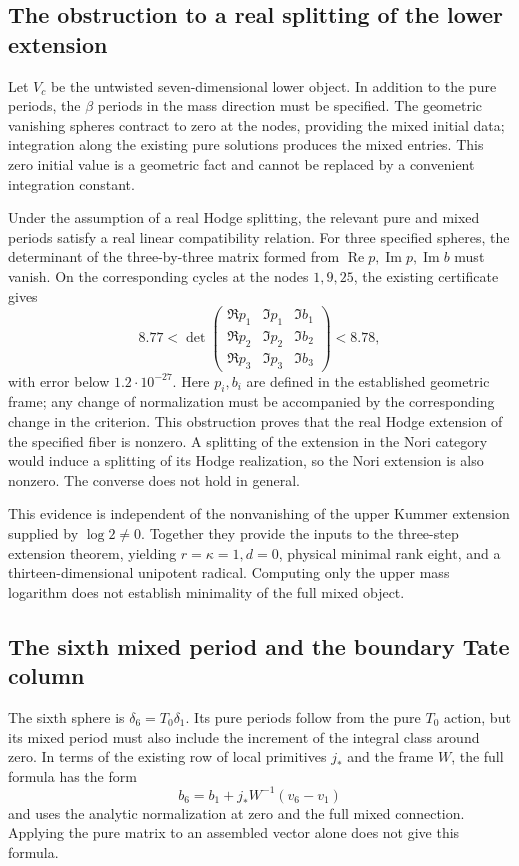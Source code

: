 \documentclass[11pt,a4paper,oneside]{article}
\theoremstyle{plain}
\theoremstyle{definition}
\theoremstyle{remark}
\numberwithin{equation}{section}
\begin{document}
\subsection{The obstruction to a real splitting of the lower extension}
Let $V_c$ be the untwisted seven-dimensional lower object. In addition to the pure periods, the $\beta$ periods in the mass direction must be specified. The geometric vanishing spheres contract to zero at the nodes, providing the mixed initial data; integration along the existing pure solutions produces the mixed entries. This zero initial value is a geometric fact and cannot be replaced by a convenient integration constant.

Under the assumption of a real Hodge splitting, the relevant pure and mixed periods satisfy a real linear compatibility relation. For three specified spheres, the determinant of the three-by-three matrix formed from $\operatorname{Re}p,\operatorname{Im}p,\operatorname{Im}b$ must vanish. On the corresponding cycles at the nodes $1,9,25$, the existing certificate gives
\begin{equation}
 8.77<\det\begin{pmatrix}
 \Re p_1&\Im p_1&\Im b_1\\
 \Re p_2&\Im p_2&\Im b_2\\
 \Re p_3&\Im p_3&\Im b_3
 \end{pmatrix}<8.78,
\end{equation}
with error below $1.2\cdot10^{-27}$. Here $p_i,b_i$ are defined in the established geometric frame; any change of normalization must be accompanied by the corresponding change in the criterion. This obstruction proves that the real Hodge extension of the specified fiber is nonzero. A splitting of the extension in the Nori category would induce a splitting of its Hodge realization, so the Nori extension is also nonzero. The converse does not hold in general.

This evidence is independent of the nonvanishing of the upper Kummer extension supplied by $\log2\ne0$. Together they provide the inputs to the three-step extension theorem, yielding $r=\kappa=1,d=0$, physical minimal rank eight, and a thirteen-dimensional unipotent radical. Computing only the upper mass logarithm does not establish minimality of the full mixed object.


\subsection{The sixth mixed period and the boundary Tate column}
The sixth sphere is $\delta_6=T_0\delta_1$. Its pure periods follow from the pure $T_0$ action, but its mixed period must also include the increment of the integral class around zero. In terms of the existing row of local primitives $j_*$ and the frame $W$, the full formula has the form
\begin{equation}
 b_6=b_1+j_*W^{-1}(v_6-v_1)
\end{equation}
and uses the analytic normalization at zero and the full mixed connection. Applying the pure matrix to an assembled vector alone does not give this formula.
\end{document}
